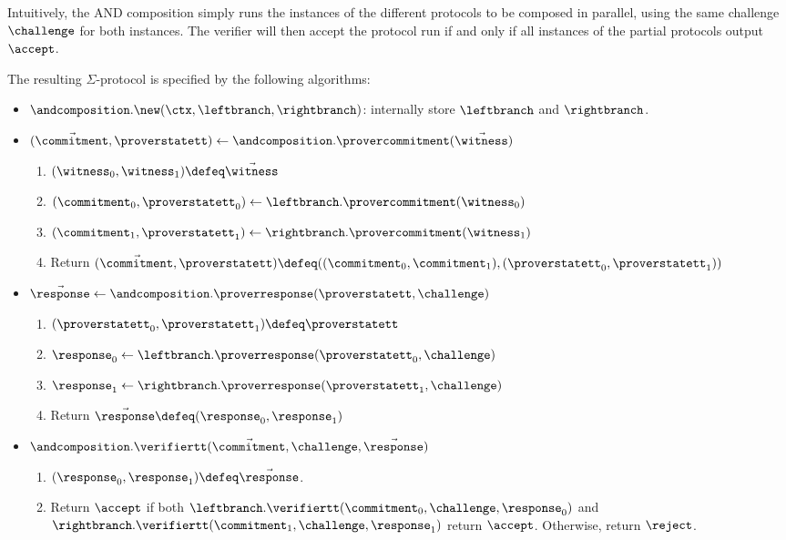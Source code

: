 \documentclass[11pt]{article}
\begin{document}
  Intuitively, the AND composition simply runs the instances of the different protocols to be composed in parallel, using the same challenge $\challenge$ for both instances.
  The verifier will then accept the protocol run if and only if all instances of the partial protocols output $\accept$.


The resulting $\Sigma$-protocol is specified by the following algorithms:
\begin{itemize}
  \item
  $\andcomposition.\new(\ctx, \leftbranch, \rightbranch)$: internally store $\leftbranch$ and $\rightbranch$.
  \item
  $(\vec \commitment, \proverstatett)\gets \andcomposition.\provercommitment(\vec \witness)$
    \begin{enumerate}
      \item
        $(\witness_0,\witness_1)\defeq \vec \witness$
      \item
        $(\commitment_0,\proverstatett_0)\gets\leftbranch.\provercommitment(\witness_0)$
      \item $(\commitment_1,\proverstatett_1)\gets\rightbranch.\provercommitment(\witness_1)$
      \item
	Return $(\vec \commitment,\proverstatett) \defeq ((\commitment_0,  \commitment_1),(\proverstatett_0,\proverstatett_1))$
    \end{enumerate}
  \item
  $\vec \response \gets \andcomposition.\proverresponse(\proverstatett, \challenge)$
  \begin{enumerate}
      \item
	    $(\proverstatett_0,\proverstatett_1)\defeq \proverstatett$
      \item
      $\response_0\gets\leftbranch.\proverresponse(\proverstatett_0, \challenge)$
      \item
      $\response_1\gets\rightbranch.\proverresponse(\proverstatett_1, \challenge)$
      \item
      Return $\vec \response\defeq(\response_0,\response_1)$
    \end{enumerate}
  \item
  $\andcomposition.\verifiertt(\vec \commitment, \challenge, \vec \response)$
  \begin{enumerate}
      \item
        $(\response_0,\response_1)\defeq \vec \response$.
      \item
	Return $\accept$ if both $\leftbranch.\verifiertt(\commitment_0,\challenge, \response_0)$ and $\rightbranch.\verifiertt(\commitment_1,\challenge, \response_1)$ return $\accept$. Otherwise, return $\reject$.

\end{enumerate}
\end{itemize}
\end{document}
